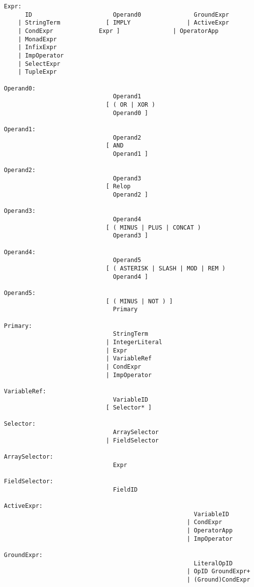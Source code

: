 \begin{verbatim}
Expr:
      ID                       Operand0               GroundExpr
    | StringTerm             [ IMPLY                | ActiveExpr
    | CondExpr		       Expr ]               | OperatorApp
    | MonadExpr
    | InfixExpr
    | ImpOperator
    | SelectExpr
    | TupleExpr

Operand0:		       
                               Operand1
                             [ ( OR | XOR )
                               Operand0 ]

Operand1:		       
                               Operand2
                             [ AND
                               Operand1 ]

Operand2:
                               Operand3
                             [ Relop
                               Operand2 ]

Operand3:
                               Operand4
                             [ ( MINUS | PLUS | CONCAT )
                               Operand3 ]

Operand4:
                               Operand5
                             [ ( ASTERISK | SLASH | MOD | REM )
                               Operand4 ]

Operand5:
                             [ ( MINUS | NOT ) ]
                               Primary

Primary:
                               StringTerm
                             | IntegerLiteral
                             | Expr
                             | VariableRef
                             | CondExpr
                             | ImpOperator

VariableRef:
                               VariableID
                             [ Selector* ]

Selector:
                               ArraySelector
                             | FieldSelector

ArraySelector:
                               Expr

FieldSelector:
                               FieldID

ActiveExpr:
                                                      VariableID
                                                    | CondExpr
                                                    | OperatorApp
                                                    | ImpOperator

GroundExpr:
                                                      LiteralOpID
                                                    | OpID GroundExpr+
                                                    | (Ground)CondExpr


\end{verbatim}
